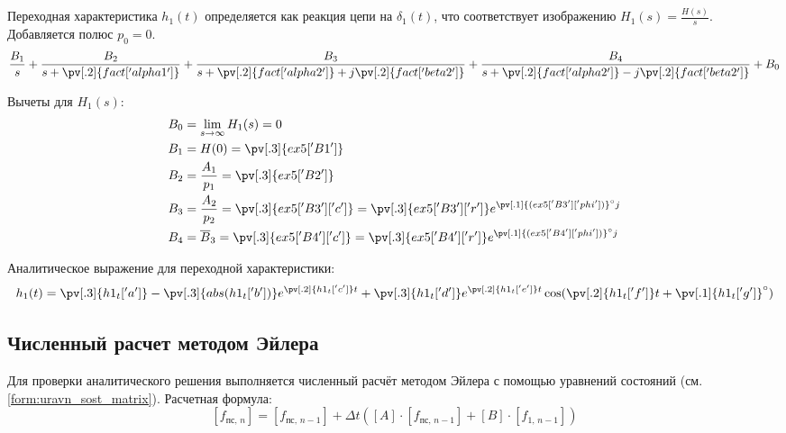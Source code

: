 Переходная характеристика $h_1(t)$ определяется как реакция цепи на $\delta_1(t)$, что соответствует изображению $H_1(s) = \frac{H(s)}{s}$. Добавляется полюс $p_0 = 0$.
\begin{equation}
    \frac{B_1}{s} +
    \frac{B_2}{s + \pv[.2]{fact['alpha1']}} +
    \frac{B_3}{s + \pv[.2]{fact['alpha2']} + j\pv[.2]{fact['beta2']}} +
    \frac{B_4}{s + \pv[.2]{fact['alpha2']} - j\pv[.2]{fact['beta2']}} +
    B_0
\end{equation}

Вычеты для $H_1(s)$:
\begin{equation}
    \begin{aligned}
        B_0 &= \lim_{s\to\infty} H_1(s) = 0 \\
        B_1 &= H(0) = \pv[.3]{ex5['B1']} \\
        B_2 &= \frac{A_1}{p_1} = \pv[.3]{ex5['B2']} \\
        B_3 &= \frac{A_2}{p_2} = \pv[.3]{ex5['B3']['c']} = \pv[.3]{ex5['B3']['r']} e^{\pv[.1]{(ex5['B3']['phi'])}^\circ j} \\
        B_4 &= \overline{B}_3 = \pv[.3]{ex5['B4']['c']} = \pv[.3]{ex5['B4']['r']} e^{\pv[.1]{(ex5['B4']['phi'])}^\circ j}    
    \end{aligned}
\end{equation}

Аналитическое выражение для переходной характеристики:
\begin{equation}
    h_1(t) = \pv[.3]{h1_t['a']} - \pv[.3]{abs(h1_t['b'])} e^{\pv[.2]{h1_t['c']} t} + \pv[.3]{h1_t['d']} e^{\pv[.2]{h1_t['e']} t} \cos(\pv[.2]{h1_t['f']} t + \pv[.1]{h1_t['g']}^\circ)
    \label{form:h1t}
\end{equation}

\subsection{Численный расчет методом Эйлера}
\label{sec:Euler}

Для проверки аналитического решения выполняется численный расчёт методом Эйлера с помощью уравнений состояний (см. \cref{form:uravn_sost_matrix}). Расчетная формула:
\begin{equation}
    \left[f_{\text{пс, }n}\right] = \left[f_{\text{пс, }n-1}\right] + \Delta t \left(
        \left[A\right]\cdot\left[f_{\text{пс, }n-1}\right] +
        \left[B\right]\cdot\left[f_{1\text{, }n-1}\right]
    \right)
\end{equation}


